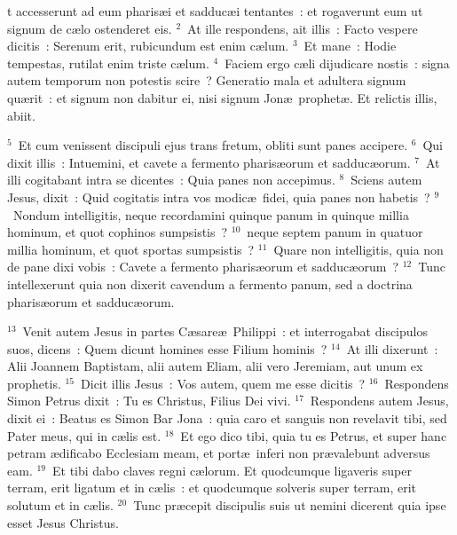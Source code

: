 \bchapter
{}t accesserunt ad eum pharis\ae i et sadduc\ae i tentantes~: et rogaverunt eum ut signum de c\ae lo ostenderet eis.
${}^{2}$~At ille respondens, ait illis~: Facto vespere dicitis~: Serenum erit, rubicundum est enim c\ae lum.
${}^{3}$~Et mane~: Hodie tempestas, rutilat enim triste c\ae lum.
${}^{4}$~Faciem ergo c\ae li dijudicare nostis~: signa autem temporum non potestis scire~? Generatio mala et adultera signum qu\ae rit~: et signum non dabitur ei, nisi signum Jon\ae\ prophet\ae . Et relictis illis, abiit.


${}^{5}$~Et cum venissent discipuli ejus trans fretum, obliti sunt panes accipere.
${}^{6}$~Qui dixit illis~: Intuemini, et cavete a fermento pharis\ae orum et sadduc\ae orum.
${}^{7}$~At illi cogitabant intra se dicentes~: Quia panes non accepimus.
${}^{8}$~Sciens autem Jesus, dixit~: Quid cogitatis intra vos modic\ae\ fidei, quia panes non habetis~?
${}^{9}$~Nondum intelligitis, neque recordamini quinque panum in quinque millia hominum, et quot cophinos sumpsistis~?
${}^{10}$~neque septem panum in quatuor millia hominum, et quot sportas sumpsistis~?
${}^{11}$~Quare non intelligitis, quia non de pane dixi vobis~: Cavete a fermento pharis\ae orum et sadduc\ae orum~?
${}^{12}$~Tunc intellexerunt quia non dixerit cavendum a fermento panum, sed a doctrina pharis\ae orum et sadduc\ae orum.


${}^{13}$~Venit autem Jesus in partes C\ae sare\ae\ Philippi~: et interrogabat discipulos suos, dicens~: Quem dicunt homines esse Filium hominis~?
${}^{14}$~At illi dixerunt~: Alii Joannem Baptistam, alii autem Eliam, alii vero Jeremiam, aut unum ex prophetis.
${}^{15}$~Dicit illis Jesus~: Vos autem, quem me esse dicitis~?
${}^{16}$~Respondens Simon Petrus dixit~: Tu es Christus, Filius Dei vivi.
${}^{17}$~Respondens autem Jesus, dixit ei~: Beatus es Simon Bar Jona~: quia caro et sanguis non revelavit tibi, sed Pater meus, qui in c\ae lis est.
${}^{18}$~Et ego dico tibi, quia tu es Petrus, et super hanc petram \ae dificabo Ecclesiam meam, et port\ae\ inferi non pr\ae valebunt adversus eam.
${}^{19}$~Et tibi dabo claves regni c\ae lorum. Et quodcumque ligaveris super terram, erit ligatum et in c\ae lis~: et quodcumque solveris super terram, erit solutum et in c\ae lis.
${}^{20}$~Tunc pr\ae cepit discipulis suis ut nemini dicerent quia ipse esset Jesus Christus.


